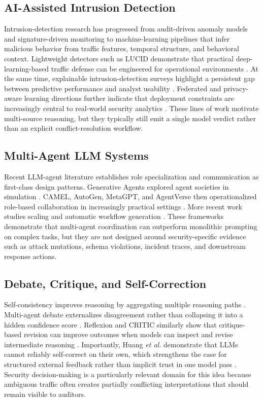 \documentclass{ieeeaccess}
\begin{document}
\subsection{AI-Assisted Intrusion Detection}
Intrusion-detection research has progressed from audit-driven anomaly models and signature-driven monitoring \cite{denning1987intrusion,roesch1999snort} to machine-learning pipelines that infer malicious behavior from traffic features, temporal structure, and behavioral context. Lightweight detectors such as LUCID demonstrate that practical deep-learning-based traffic defense can be engineered for operational environments \cite{doriguzzi2020lucid}. At the same time, explainable intrusion-detection surveys highlight a persistent gap between predictive performance and analyst usability \cite{neupane2022xids}. Federated and privacy-aware learning directions further indicate that deployment constraints are increasingly central to real-world security analytics \cite{buyuktanir2025federated}. These lines of work motivate multi-source reasoning, but they typically still emit a single model verdict rather than an explicit conflict-resolution workflow.

\subsection{Multi-Agent LLM Systems}
Recent LLM-agent literature establishes role specialization and communication as first-class design patterns. Generative Agents explored agent societies in simulation \cite{park2023generative}. CAMEL, AutoGen, MetaGPT, and AgentVerse then operationalized role-based collaboration in increasingly practical settings \cite{li2023camel,wu2024autogen,hong2024metagpt,chen2024agentverse}. More recent work studies scaling and automatic workflow generation \cite{qian2025scaling,zhang2025aflow}. These frameworks demonstrate that multi-agent coordination can outperform monolithic prompting on complex tasks, but they are not designed around security-specific evidence such as attack mutations, schema violations, incident traces, and downstream response actions.

\subsection{Debate, Critique, and Self-Correction}
Self-consistency improves reasoning by aggregating multiple reasoning paths \cite{wang2023selfconsistency}. Multi-agent debate externalizes disagreement rather than collapsing it into a hidden confidence score \cite{du2024debate}. Reflexion and CRITIC similarly show that critique-based revision can improve outcomes when models can inspect and revise intermediate reasoning \cite{shinn2023reflexion,gou2024critic}. Importantly, Huang \emph{et al.} demonstrate that LLMs cannot reliably self-correct on their own, which strengthens the case for structured external feedback rather than implicit trust in one model pass \cite{huang2024selfcorrect}. Security decision-making is a particularly relevant domain for this idea because ambiguous traffic often creates partially conflicting interpretations that should remain visible to auditors.
\end{document}
